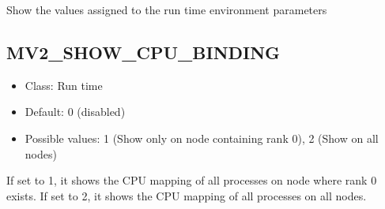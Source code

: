 Show the values assigned to the run time environment parameters

\subsection{MV2\_SHOW\_CPU\_BINDING}
\label{def:show-cpu-binding}
\begin{itemize}
    \item Class: Run time
    \item Default: 0 (disabled)
    \item Possible values: 1 (Show only on node containing rank 0), 2 (Show on all nodes)
\end{itemize}

If set to 1, it shows the CPU mapping of all processes on node where rank 0
exists.  If set to 2, it shows the CPU mapping of all processes on all nodes.

